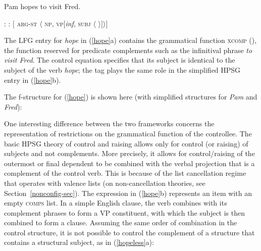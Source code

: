 \begin{exe} 
\ex	\label{hope}
Pam hopes to visit Fred.
\begin{xlist} 
\ex	
{}: \qquad {}
\ex 
{}:  \qquad  $[$ \textsc{arg-st} $\langle$ \textsc{np}, \textsc{vp}[\textit{inf}, \textsc{subj} $\langle$  $ \rangle ] \rangle ]$
\end{xlist}
\end{exe}
The LFG entry for \textit{hope} in (\ref{hope}a) contains the grammatical function \textsc{xcomp} (), the function reserved for predicate complements such as the infinitival phrase \textit{to visit Fred}.  The control equation specifies that its subject is identical to the subject of the verb \textit{hope}; the  tag  plays the same role in the simplified HPSG entry in (\ref{hope}b).  

The f-structure for (\ref{hope}) is shown here (with simplified structures for \textit{Pam} and \textit{Fred}):

\begin{exe}
\ex \label{hopefs} 
\end{exe}

\noindent
One interesting difference between the two frameworks concerns the representation of restrictions on the grammatical function of the controllee.   The basic HPSG theory of control and raising \citep[for example, the one presented in][132-145]{ps2} allows only for control (or raising) of subjects and not complements.  More precisely, it allows for control/raising of the outermost or final dependent to be combined with the verbal projection that is a complement of the control verb.  This is because of the list cancellation regime that operates with valence lists (on non-cancellation theories, see Section~\ref{nonconfig-sec}).  The expression  in  (\ref{hope}b) represents an item with an empty \textsc{comps} list.  In a simple English clause, the verb combines with its complement phrases to form a VP constituent, with which the subject is then combined to form a clause.  Assuming the same order of combination in the control structure, it is not possible to control the complement of a structure that contains a structural subject, as in (\ref{hopeless}a):

